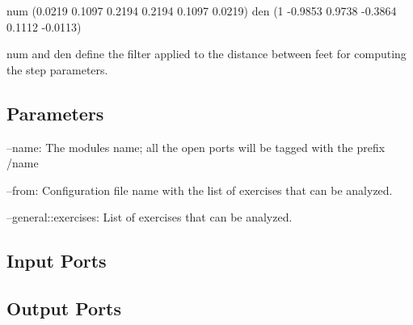 \begin{DoxyCode}
[step\_0]
num                            (0.0219 0.1097 0.2194 0.2194 0.1097 0.0219)
den                            (1 -0.9853 0.9738 -0.3864 0.1112 -0.0113)
\end{DoxyCode}


{\ttfamily num} and {\ttfamily den} define the filter applied to the distance between feet for computing the step parameters.\hypertarget{group__skeletonViewer_parameters_sec}{}\subsection{Parameters}\label{group__skeletonViewer_parameters_sec}

\begin{DoxyItemize}
\item --name\+: The module\textquotesingle{}s name; all the open ports will be tagged with the prefix /name
\item --from\+: Configuration file name with the list of exercises that can be analyzed.
\item --general\+::exercises\+: List of exercises that can be analyzed. 
\end{DoxyItemize}\hypertarget{group__skeletonViewer_inputports_sec}{}\subsection{Input Ports}\label{group__skeletonViewer_inputports_sec}
\hypertarget{group__skeletonViewer_outputports_sec}{}\subsection{Output Ports}\label{group__skeletonViewer_outputports_sec}

